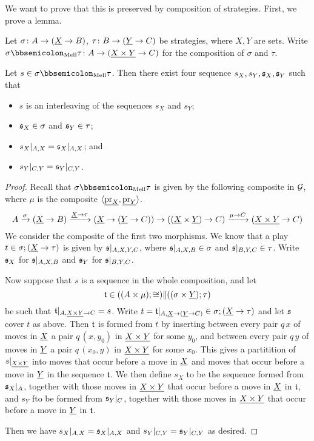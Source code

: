 \documentclass{report}[11pt]
\begin{document}
We want to prove that this is preserved by composition of strategies.  
First, we prove a lemma.

\begin{lemma}
  Let $\sigma\colon A \to ({\underline{X}} \to B)$, $\tau \colon B \to ({\underline{Y}} \to C)$ be strategies, where $X,Y$ are sets.
  Write $\sigma\semicom_{\text{Mell}}\tau \from A \to (\ul{X\times Y} \to C)$ for the \Mellies composition of $\sigma$ and $\tau$.

  Let $s\in\sigma\semicom_{\text{Mell}}\tau$.  
  Then there exist four sequence $s_X,s_Y,\mathfrak s_X,\mathfrak s_Y$ such that
  \begin{itemize}
    \item $s$ is an interleaving of the sequences $s_X$ and $s_Y$;
    \item $\mathfrak s_X\in\sigma$ and $\mathfrak s_Y\in\tau$;
    \item $s_X\vert_{A,X} = \mathfrak s_X\vert_{A,X}$; and
    \item $s_Y\vert_{C,Y} = \mathfrak s_Y\vert_{C,Y}$.
  \end{itemize}
  \label{LemMelliesDecomposition}
\end{lemma}
\begin{proof}
  Recall that $\sigma\semicom_{\text{Mell}}\tau$ is given by the following composite in $\mathcal G$, where $\mu$ is the composite $\langle{\underline{\operatorname{pr}_X}},{\underline{\operatorname{pr}_Y}}\rangle$.
  \[
    A \xrightarrow{\sigma}
    ({\underline{X}} \to B) \xrightarrow{{\underline{X}} \to \tau}
    ({\underline{X}} \to ({\underline{Y}} \to C)) \to
    (({\underline{X}} \times {\underline{Y}}) \to C) \xrightarrow{\mu\to C}
    ({\underline{X\times Y}} \to C)
    \]
  We consider the composite of the first two morphisms.  
  We know that a play $t\in \sigma;({\underline{X}}\to \tau)$ is given by $\mathfrak s\vert_{A,X,Y,C}$, where $\mathfrak s\vert_{A,X,B}\in\sigma$ and $\mathfrak s\vert_{B,Y,C}\in\tau$.
  Write $\mathfrak s_X$ for $\mathfrak s\vert_{A,X,B}$ and $\mathfrak s_Y$ for $\mathfrak s\vert_{B,Y,C}$.

  Now suppose that $s$ is a sequence in the whole composition, and let
  \[
    \mathfrak t\in ((A\times\mu);\cong)\|((\sigma\times {\underline{Y}});\tau)
    \]
  be such that $\mathfrak t\vert_{A,{\underline{X \times Y}}\to C}=s$.
  Write $t=\mathfrak t\vert_{A,{\underline{X}} \to ({\underline{Y}} \to C)}\in\sigma;({\underline{X}} \to \tau)$ and let $\mathfrak s$ cover $t$ as above.
  Then $\mathfrak t$ is formed from $t$ by inserting between every pair $q\,x$ of moves in ${\underline{X}}$ a pair $q\,(x,y_0)$ in ${\underline{X\times Y}}$ for some $y_0$, and between every pair $q\,y$ of moves in ${\underline{Y}}$ a pair $q\,(x_0,y)$ in ${\underline{X \times Y}}$ for some $x_0$.
  This gives a partitition of $s\vert_{{\underline{X \times Y}}}$ into moves that occur before a move in ${\underline{X}}$ and moves that occur before a move in ${\underline{Y}}$ in the sequence $\mathfrak t$.
  We then define $s_X$ to be the sequence formed from $\mathfrak s_X\vert_A$, together with those moves in ${\underline{X \times Y}}$ that occur before a move in ${\underline{X}}$ in $\mathfrak t$, and $s_Y$ fto be formed from $\mathfrak s_Y\vert_C$, together with those moves in ${\underline{X\times Y}}$ that occur before a move in ${\underline{Y}}$ in $\mathfrak t$.

  Then we have $s_X\vert_{A,X}=\mathfrak s_X\vert_{A,X}$ and $s_Y\vert_{C,Y} = \mathfrak s_Y\vert_{C,Y}$ as desired.
\end{proof}
\end{document}
